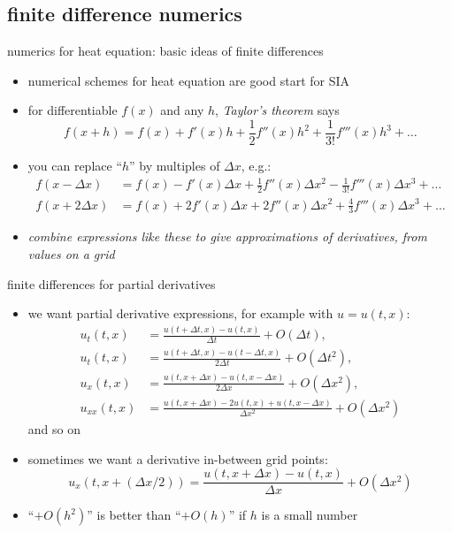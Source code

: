 \documentclass[titlepage,letterpaper,final,11pt]{scrartcl}
\begin{document}
\subsection{finite difference numerics}

numerics for heat equation: basic ideas of finite differences

\begin{itemize}
\item numerical schemes for heat equation are good start for SIA
\item for differentiable $f(x)$ and any $h$, \emph{Taylor's theorem} says
	$$f(x+h) = f(x) + f'(x) h + \frac{1}{2} f''(x) h^2 + \frac{1}{3!} f'''(x) h^3 + \dots$$
\item you can replace ``$h$'' by multiples of $\Delta x$, e.g.:
\begin{align*}
f(x-\Delta x) &= f(x) - f'(x) \Delta x + \frac{1}{2} f''(x) \Delta x^2 - \frac{1}{3!} f'''(x) \Delta x^3 + \dots \\
f(x+2\Delta x) &= f(x) + 2 f'(x) \Delta x + 2 f''(x) \Delta x^2 + \frac{4}{3} f'''(x) \Delta x^3 + \dots
\end{align*}
\item \emph{combine expressions like these to give approximations of derivatives, from values on a grid}
\end{itemize}

finite differences for partial derivatives

\begin{itemize}
\item we want partial derivative expressions, for example with $u=u(t,x)$:
\begin{align*}
u_t(t,x) &= \frac{u(t+\Delta t,x) - u(t,x)}{\Delta t} + O(\Delta t), \\
u_t(t,x) &= \frac{u(t+\Delta t,x) - u(t-\Delta t,x)}{2\Delta t} + O(\Delta t^2), \\
u_x(t,x) &= \frac{u(t,x+\Delta x) - u(t,x-\Delta x)}{2\Delta x} + O(\Delta x^2), \\
u_{xx}(t,x) &= \frac{u(t,x+\Delta x) - 2 u(t,x) + u(t,x-\Delta x)}{\Delta x^2} + O(\Delta x^2)
\end{align*}
and so on
\item sometimes we want a derivative in-between grid points:
	$$u_x(t,x+(\Delta x/2)) = \frac{u(t,x+\Delta x) - u(t,x)}{\Delta x} + O(\Delta x^2)$$
\item ``$+O(h^2)$'' is better than ``$+O(h)$'' if $h$ is a small number
\end{itemize}
\end{document}

